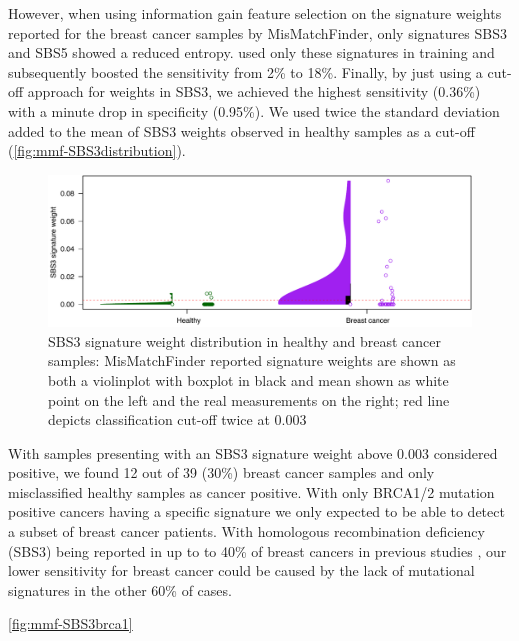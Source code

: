 However, when using information gain feature selection on the signature weights reported for the breast cancer samples by MisMatchFinder, only signatures SBS3 and SBS5 showed a reduced entropy.  used only these signatures in training and subsequently boosted the sensitivity from 2\% to 18\%. Finally, by just using a cut-off approach for weights in SBS3, we achieved the highest sensitivity (0.36\%) with a minute drop in specificity (0.95\%). We used twice the standard deviation added to the mean of SBS3 weights observed in healthy samples as a cut-off (\autoref{fig:mmf-SBS3distribution}).

\begin{figure}[ht]
\centering
\includegraphics[width=.99\linewidth]{Figures/MisMatchFinder/SBS3Distributions.pdf}
\caption[SBS3 signature weight distribution in healthy and breast cancer samples]{SBS3 signature weight distribution in healthy and breast cancer samples: MisMatchFinder reported signature weights are shown as both a violinplot with boxplot in black and mean shown as white point on the left and the real measurements on the right; red line depicts classification cut-off twice at 0.003}\label{fig:mmf-SBS3distribution}
\end{figure}

With samples presenting with an SBS3 signature weight above 0.003 considered positive, we found 12 out of 39 (30\%) breast cancer samples and only misclassified  healthy samples as cancer positive. With only BRCA1/2 mutation positive cancers having a specific signature we only expected to be able to detect a subset of breast cancer patients. With homologous recombination deficiency (SBS3) being reported in up to to 40\% of breast cancers in previous studies \cite{AkashiTanaka2015}, our lower sensitivity for breast cancer could be caused by the lack of mutational signatures in the other 60\% of cases.

\autoref{fig:mmf-SBS3brca1} 

